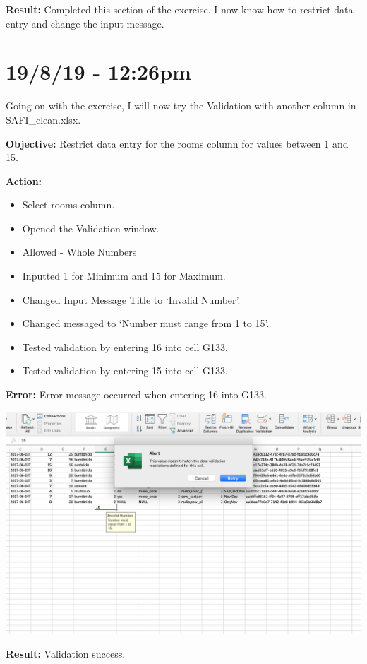 \documentclass{article}
\begin{document}
\textbf{Result:} Completed this section of the exercise. I now know how to restrict data entry and change the input message.

\section*{19/8/19 - 12:26pm}

Going on with the exercise, I will now try the Validation with another column in SAFI\_clean.xlsx.

\textbf{Objective:} Restrict data entry for the rooms column for values between 1 and 15.

\textbf{Action:} 
\begin{itemize}
    \item Select rooms column.
    \item Opened the Validation window.
    \item Allowed - Whole Numbers
    \item Inputted 1 for Minimum and 15 for Maximum.
    \item Changed Input Message Title to ‘Invalid Number’.
    \item Changed messaged to ‘Number must range from 1 to 15’.
    \item Tested validation by entering 16 into cell G133.
    \item Tested validation by entering 15 into cell G133.
\end{itemize}

\textbf{Error:} Error message occurred when entering 16 into G133.

\includegraphics[width=\textwidth]{figc.png}

\textbf{Result:} Validation success.
\end{document}
